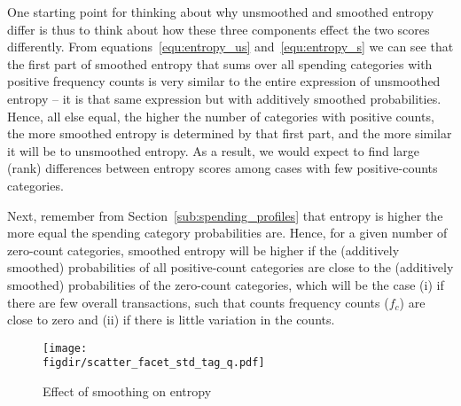 One starting point for thinking about why unsmoothed and smoothed entropy
differ is thus to think about how these three components effect the two scores
differently. From equations~\ref{equ:entropy_us} and~\ref{equ:entropy_s} we can
see that the first part of smoothed entropy that sums over all spending
categories with positive frequency counts is very similar to the entire
expression of unsmoothed entropy -- it is that same expression but with
additively smoothed probabilities. Hence, all else equal, the higher the number
of categories with positive counts, the more smoothed entropy is determined by
that first part, and the more similar it will be to unsmoothed entropy. As a
result, we would expect to find large (rank) differences between entropy scores
among cases with few positive-counts categories.

Next, remember from Section~\ref{sub:spending_profiles} that entropy is higher
the more equal the spending category probabilities are. Hence, for a given
number of zero-count categories, smoothed entropy will be higher if the
(additively smoothed) probabilities of all positive-count categories are close
to the (additively smoothed) probabilities of the zero-count categories, which
will be the case (i) if there are few overall transactions, such that counts
frequency counts ($f_c$) are close to zero and (ii) if there is little
variation in the counts.

\begin{figure}[ht]
    \centering 
    \caption{Effect of smoothing on entropy}
    \label{fig:scatter_facets}
    \texttt{[image: \\figdir/scatter\_facet\_std\_tag\_q.pdf]}
\end{figure}

